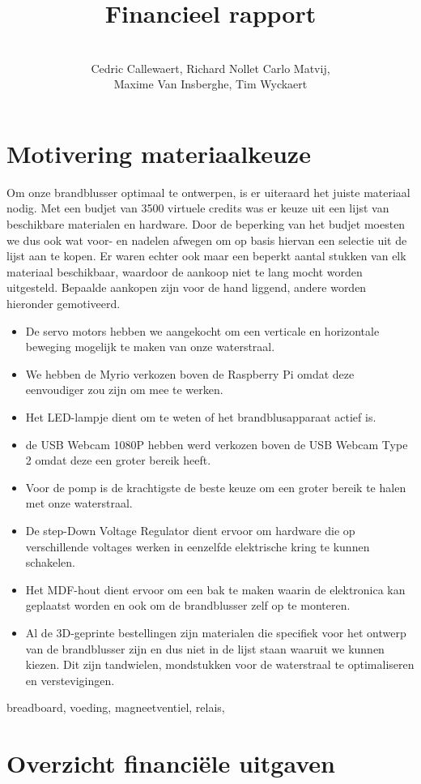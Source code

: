 \documentclass[kulak]{kulakarticle} %
\title{Financieel rapport}
\author{ \\Cedric Callewaert, Richard Nollet 
	Carlo Matvij,\\ Maxime Van Insberghe, Tim Wyckaert}
\begin{document}
\maketitle
	
	\section{Motivering materiaalkeuze}
	Om onze brandblusser optimaal te ontwerpen, is er uiteraard het juiste materiaal nodig. Met een budjet van 3500 virtuele credits was er keuze uit een lijst van beschikbare materialen en hardware. Door de beperking van het budjet moesten we dus ook wat voor- en nadelen afwegen om op basis hiervan een selectie uit de lijst aan te kopen.	Er waren echter ook maar een beperkt aantal stukken van elk materiaal beschikbaar, waardoor de aankoop niet te lang mocht worden uitgesteld.
	Bepaalde aankopen zijn voor de hand liggend, andere worden hieronder gemotiveerd.
	
	\begin{itemize}
	\item De servo motors hebben we aangekocht om een verticale en horizontale beweging mogelijk te maken van onze waterstraal.
	
	\item We hebben de Myrio verkozen boven de Raspberry Pi omdat deze eenvoudiger zou zijn om mee te werken.
	
	\item Het LED-lampje dient om te weten of het brandblusapparaat actief is.
	
	\item de USB Webcam 1080P hebben werd verkozen boven de USB Webcam Type 2 omdat deze een groter bereik heeft. 
	
	\item Voor de pomp is de krachtigste de beste keuze om een groter bereik te halen met onze waterstraal. 
	
	\item De step-Down Voltage Regulator dient ervoor om hardware die op verschillende voltages werken in eenzelfde elektrische kring te kunnen schakelen.
	
	\item Het MDF-hout dient ervoor om een bak te maken waarin de elektronica kan geplaatst worden en ook om de brandblusser zelf op te monteren.
	
	\item Al de 3D-geprinte bestellingen zijn materialen die specifiek voor het ontwerp van de brandblusser zijn en dus niet in de lijst staan waaruit we kunnen kiezen. Dit zijn tandwielen, mondstukken voor de waterstraal te optimaliseren en verstevigingen. 
	\end{itemize}
	breadboard, voeding, magneetventiel, relais, 
	
	\section{Overzicht financiële uitgaven}
	

	
	
	
	
\end{document}
